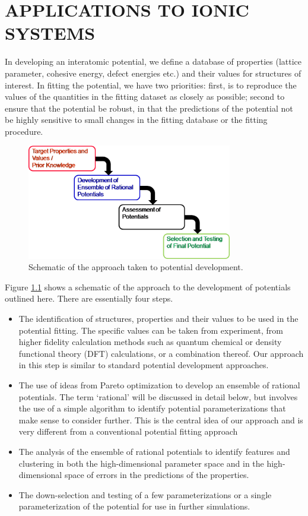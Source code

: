 \chapter{APPLICATIONS TO IONIC SYSTEMS}

In developing an interatomic potential, we define a database of properties (lattice parameter, cohesive energy, defect energies etc.) and their values for structures of interest. In fitting the potential, we have two priorities: first, is to reproduce the values of the quantities in the fitting dataset as closely as possible; second to ensure that the potential be robust, in that the predictions of the potential not be highly sensitive to small changes in the fitting database or the fitting procedure.

\begin{figure}[h]
	\centering
  \includegraphics[width=0.8\textwidth]{chapter7/pareto_schematic}
  \caption{Schematic of the approach taken to potential development.}
  \label{fig:pareto_schematic}
\end{figure}

Figure \ref{fig:pareto_schematic} shows a schematic of the approach to the development of potentials outlined here. There are essentially four steps.
\begin{itemize}
	\item The identification of structures, properties and their values to be used in the potential fitting. The specific values can be taken from experiment, from higher fidelity calculation methods such as quantum chemical or density functional theory (DFT) calculations, or a combination thereof. Our approach in this step is similar to standard potential development approaches.
 \item The use of ideas from Pareto optimization to develop an ensemble of rational potentials. The term ‘rational’ will be discussed in detail below, but involves the use of a simple algorithm to identify potential parameterizations that make sense to consider further. This is the central idea of our approach and is very different from a conventional potential fitting approach
 	\item The analysis of the ensemble of rational potentials to identify features and clustering in both the high-dimensional parameter space and in the high-dimensional space of errors in the predictions of the properties.
 	\item The down-selection and testing of a few parameterizations or a single parameterization of the potential for use in further simulations.
\end{itemize}


